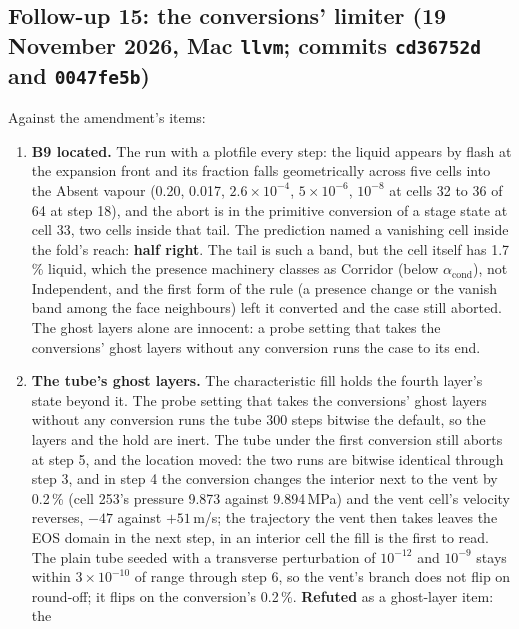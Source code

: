 \documentclass[11pt,a4paper]{article}
\newcommand{\code}[1]{\texttt{\small #1}}
\begin{document}
\subsection{Follow-up 15: the conversions' limiter (19 November 2026, Mac \code{llvm}; commits \code{cd36752d} and \code{0047fe5b})}
\label{sec:fu15}

Against the amendment's items:
\begin{enumerate}[nosep]
\item \textbf{B9 located.}  The run with a plotfile every step: the
      liquid appears by flash at the expansion front and its fraction
      falls geometrically across five cells into the Absent vapour
      (0.20, 0.017, $2.6\times10^{-4}$, $5\times10^{-6}$, $10^{-8}$ at
      cells 32 to 36 of 64 at step 18), and the abort is in the
      primitive conversion of a stage state at cell 33, two cells
      inside that tail.  The prediction named a vanishing cell inside
      the fold's reach: \textbf{half right}.  The tail is such a band,
      but the cell itself has 1.7\,\% liquid, which the presence
      machinery classes as Corridor (below $\alpha_{\mathrm{cond}}$), not
      Independent, and the first form of the rule (a presence change or
      the vanish band among the face neighbours) left it converted and
      the case still aborted.  The ghost layers alone are innocent: a
      probe setting that takes the conversions' ghost layers without any
      conversion runs the case to its end.
\item \textbf{The tube's ghost layers.}  The characteristic fill holds
      the fourth layer's state beyond it.  The probe setting that takes
      the conversions' ghost layers without any conversion runs the tube
      300 steps bitwise the default, so the layers and the hold are
      inert.  The tube under the first conversion still aborts at step 5,
      and the location moved: the two runs are bitwise identical through
      step 3, and in step 4 the conversion changes the interior next to
      the vent by 0.2\,\% (cell 253's pressure 9.873 against 9.894\,MPa)
      and the vent cell's velocity reverses, $-47$ against $+51$\,m/s;
      the trajectory the vent then takes leaves the EOS domain in the
      next step, in an interior cell the fill is the first to read.  The
      plain tube seeded with a transverse perturbation of $10^{-12}$ and
      $10^{-9}$ stays within $3\times10^{-10}$ of range through step 6,
      so the vent's branch does not flip on round-off; it flips on the
      conversion's 0.2\,\%.  \textbf{Refuted} as a ghost-layer item: the

\end{enumerate}
\end{document}

